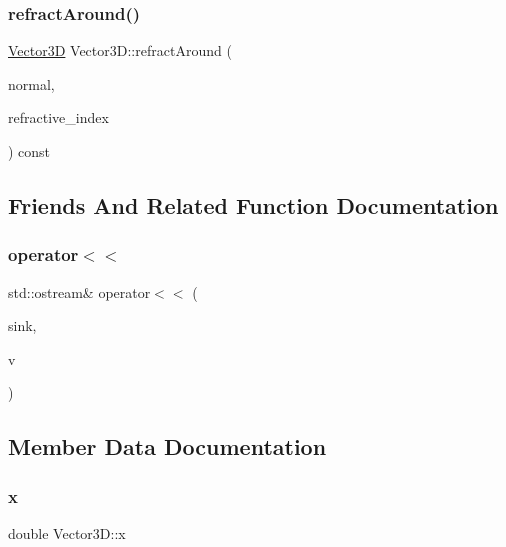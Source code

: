 \mbox{\label{classVector3D_ae9247c4b9b94bca1b65457845fa1e9df}} 
\subsubsection{\texorpdfstring{refractAround()}{refractAround()}}
{\footnotesize\ttfamily \mbox{\hyperlink{classVector3D}{Vector3D}} Vector3\+D\+::refract\+Around (\begin{DoxyParamCaption}\item[{\mbox{\hyperlink{classVector3D}{Vector3D}}}]{normal,  }\item[{double}]{refractive\+\_\+index }\end{DoxyParamCaption}) const}



\subsection{Friends And Related Function Documentation}
\mbox{\label{classVector3D_a63f31894e510c707624cd63bafd31487}} 
\subsubsection{\texorpdfstring{operator$<$$<$}{operator<<}}
{\footnotesize\ttfamily std\+::ostream\& operator$<$$<$ (\begin{DoxyParamCaption}\item[{std\+::ostream \&}]{sink,  }\item[{const \mbox{\hyperlink{classVector3D}{Vector3D}} \&}]{v }\end{DoxyParamCaption})\hspace{0.3cm}{\ttfamily [friend]}}



\subsection{Member Data Documentation}
\mbox{\label{classVector3D_a3c086dfccfc57dd996e9b8600098a430}} 
\subsubsection{\texorpdfstring{x}{x}}
{\footnotesize\ttfamily double Vector3\+D\+::x\hspace{0.3cm}{\ttfamily [protected]}}

